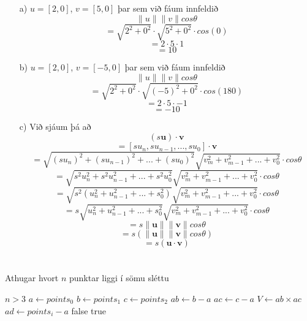 \documentclass{article}
\begin{document}
	\section{}
	\begin{itemize}
		\item[a)] $u = [2,0]$, $v = [5,0]$ þar sem við fáum innfeldið
				\[\| u\|\| v\| cos\theta\]
				\[=\sqrt{2^2+0^2}\cdot \sqrt{5^2+0^2}\cdot cos(0)\]
				\[=2\cdot5\cdot1\]
				\[=10\]
		\item[b)] $u = [2,0]$, $v = [-5,0]$ þar sem við fáum innfeldið
				\[\|u\|\|v\|cos\theta\]
				\[=\sqrt{2^2+0^2}\cdot\sqrt{(-5)^2+0^2}\cdot cos(180)\]
				\[=2\cdot5\cdot -1\]
				\[=-10\]
		\item[c)] Við sjáum þá að
			\[(s\textbf{u})\cdot\textbf{v}\]
			\[= [su_n, su_{n-1}, ...,su_0]\cdot\textbf{v}\]
			\[=\sqrt{(su_n)^2 + (su_{n-1})^2 + ...+ (su_0)^2}\sqrt{v_m^2 + 
			v_{m-1}^2 + ... + v_0^2}\cdot cos\theta\]
			\[=\sqrt{s^2u_n^2 + s^2u_{n-1}^2 + ... + s^2u_0^2}\sqrt{v_m^2 + 
			v_{m-1}^2 + ... + v_0^2}\cdot cos\theta\]
			\[=\sqrt{s^2(u_n^2 + u_{n-1}^2 + ... + s_0^2)}\sqrt{v_m^2 + 
			v_{m-1}^2 + ... + v_0^2}\cdot cos\theta\]
			\[=s\sqrt{u_n^2 + u_{n-1}^2 + ... + s_0^2}\sqrt{v_m^2 + 
			v_{m-1}^2 + ... + v_0^2}\cdot cos\theta\]
			\[=s\|\textbf{u}\|\|\textbf{v}\|cos\theta\]
			\[=s(\|\textbf{u}\|\|\textbf{v}\|cos\theta)\]
			\[=s(\textbf{u}\cdot\textbf{v})\]
	\end{itemize}

	\section{}

	\begin{algorithm}
	\caption{Athugar hvort $n$ punktar liggi í sömu sléttu}
	\begin{algorithmic}
		\Require $n>3$ 
		\State $a \gets points_0$
		\State $b \gets points_1$
		\State $c \gets points_2$
		\State $ab \gets b-a$
		\State $ac \gets c-a$
		\State $V \gets ab \times ac$ 
			\State $ad \gets points_i-a$
			 
				\State\Return false
			\EndIf
		\EndWhile
		\State\Return true
	\end{algorithmic}
	\end{algorithm}
\end{document}
